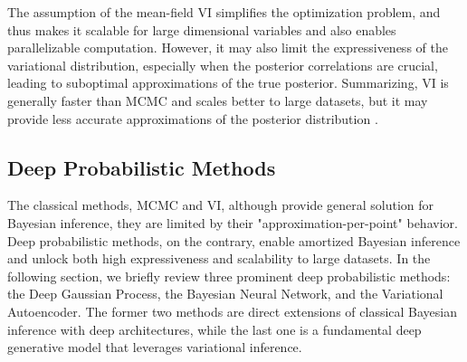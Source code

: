 The assumption of the mean-field \ac{VI} simplifies the optimization problem, and thus makes it scalable for large dimensional variables and also enables parallelizable computation. However, it may also limit the expressiveness of the variational distribution, especially when the posterior correlations are crucial, leading to suboptimal approximations of the true posterior. Summarizing, \ac{VI} is generally faster than \ac{MCMC} and scales better to large datasets, but it may provide less accurate approximations of the posterior distribution \citep{Blei_2017}. 

\subsection{Deep Probabilistic Methods}
\label{sec:introduction:background:deep_probabilistic_methods}
The classical methods, \ac{MCMC} and \ac{VI}, although provide general solution for Bayesian inference, they are limited by their "approximation-per-point" behavior. Deep probabilistic methods, on the contrary, enable amortized Bayesian inference and unlock both high expressiveness and scalability to large datasets. In the following section, we briefly review three prominent deep probabilistic methods: the Deep Gaussian Process, the Bayesian Neural Network, and the Variational Autoencoder. The former two methods are direct extensions of classical Bayesian inference with deep architectures, while the last one is a fundamental deep generative model that leverages variational inference.

